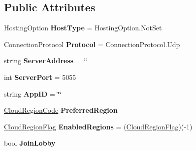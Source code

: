 \subsection*{Public Attributes}
\begin{DoxyCompactItemize}
\item 
Hosting\+Option {\bfseries Host\+Type} = Hosting\+Option.\+Not\+Set\hypertarget{class_server_settings_ae09a675e680b68d1ed6117ae990e0140}{}\label{class_server_settings_ae09a675e680b68d1ed6117ae990e0140}

\item 
Connection\+Protocol {\bfseries Protocol} = Connection\+Protocol.\+Udp\hypertarget{class_server_settings_a2fafc5c45a737f8090fef92f080bfd50}{}\label{class_server_settings_a2fafc5c45a737f8090fef92f080bfd50}

\item 
string {\bfseries Server\+Address} = \char`\"{}\char`\"{}\hypertarget{class_server_settings_ac93d5ddacf54f0efb974bb3c57537275}{}\label{class_server_settings_ac93d5ddacf54f0efb974bb3c57537275}

\item 
int {\bfseries Server\+Port} = 5055\hypertarget{class_server_settings_a61d571180623076b8a12b9d2ca550411}{}\label{class_server_settings_a61d571180623076b8a12b9d2ca550411}

\item 
string {\bfseries App\+ID} = \char`\"{}\char`\"{}\hypertarget{class_server_settings_a683ee8add05e046c395ecbcd2c077052}{}\label{class_server_settings_a683ee8add05e046c395ecbcd2c077052}

\item 
\hyperlink{_enums_8cs_af823e3be9567fa753720895120c9819b}{Cloud\+Region\+Code} {\bfseries Preferred\+Region}\hypertarget{class_server_settings_a3b8285422f8ec14b98457c0935304b6d}{}\label{class_server_settings_a3b8285422f8ec14b98457c0935304b6d}

\item 
\hyperlink{_enums_8cs_aff1692196dd6f4a13b64044f3b1456d1}{Cloud\+Region\+Flag} {\bfseries Enabled\+Regions} = (\hyperlink{_enums_8cs_aff1692196dd6f4a13b64044f3b1456d1}{Cloud\+Region\+Flag})(-\/1)\hypertarget{class_server_settings_a16c0927185e85b1c45492481b49e1721}{}\label{class_server_settings_a16c0927185e85b1c45492481b49e1721}

\item 
bool {\bfseries Join\+Lobby}\hypertarget{class_server_settings_ab20cfb9bd2fd6526bb96d76c5ef5fcdc}{}\label{class_server_settings_ab20cfb9bd2fd6526bb96d76c5ef5fcdc}


\end{DoxyCompactItemize}
